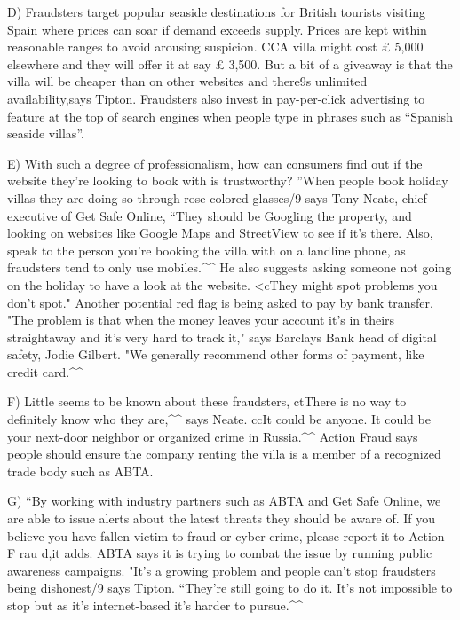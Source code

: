 \documentclass[UTF8,11pt]{ctexart}
\begin{document}
D) Fraudsters target popular seaside destinations for British tourists visiting Spain where prices can soar if demand exceeds supply. Prices are kept within reasonable ranges to avoid arousing suspicion. CCA villa might cost £ 5,000 elsewhere and they will offer it at say £ 3,500. But a bit of a giveaway is that the villa will be cheaper than on other websites and there9s unlimited availability,says Tipton. Fraudsters also invest in pay-per-click advertising to feature at the top of search engines when people type in phrases such as “Spanish seaside villas”.


E) With such a degree of professionalism, how can consumers find out if the website they're looking to book with is trustworthy? ”When people book holiday villas they are doing so through rose-colored glasses/9 says Tony Neate, chief executive of Get Safe Online, “They should be Googling the property, and looking on websites like Google Maps and StreetView to see if it's there. Also, speak to the person you're booking the villa with on a landline phone, as fraudsters tend to only use mobiles.\textasciicircum{}\textasciicircum{} He also suggests asking someone not going on the holiday to have a look at the website. <cThey might spot problems you don't spot." Another potential red flag is being asked to pay by bank transfer. "The problem is that when the money leaves your account it's in theirs straightaway and it's very hard to track it," says Barclays Bank head of digital safety, Jodie Gilbert. "We generally recommend other forms of payment, like credit card.\textasciicircum{}\textasciicircum{}


F) Little seems to be known about these fraudsters, ctThere is no way to definitely know who they are,\textasciicircum{}\textasciicircum{} says Neate. ccIt could be anyone. It could be your next-door neighbor or organized crime in Russia.\textasciicircum{}\textasciicircum{} Action Fraud says people should ensure the company renting the villa is a member of a recognized trade body such as ABTA.


G) “By working with industry partners such as ABTA and Get Safe Online, we are able to issue alerts about the latest threats they should be aware of. If you believe you have fallen victim to fraud or cyber-crime, please report it to Action F rau d,it adds. ABTA says it is trying to combat the issue by running public awareness campaigns. "It's a growing problem and people can't stop fraudsters being dishonest/9 says Tipton. “They're still going to do it. It's not impossible to stop but as it's internet-based it's harder to pursue.\textasciicircum{}\textasciicircum{}
\end{document}
